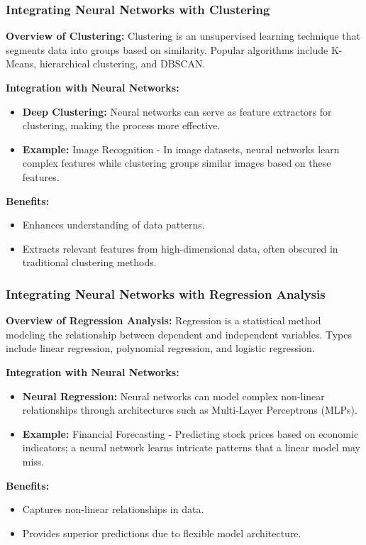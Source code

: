 \documentclass[aspectratio=169]{beamer}
\begin{document}
\begin{frame}[fragile]
    \frametitle{Integrating Neural Networks with Clustering}
    \textbf{Overview of Clustering:} Clustering is an unsupervised learning technique that segments data into groups based on similarity. Popular algorithms include K-Means, hierarchical clustering, and DBSCAN.
    
    \textbf{Integration with Neural Networks:}
    \begin{itemize}
        \item \textbf{Deep Clustering:} Neural networks can serve as feature extractors for clustering, making the process more effective.
        \item \textbf{Example:} Image Recognition - In image datasets, neural networks learn complex features while clustering groups similar images based on these features.
    \end{itemize}
    
    \textbf{Benefits:}
    \begin{itemize}
        \item Enhances understanding of data patterns.
        \item Extracts relevant features from high-dimensional data, often obscured in traditional clustering methods.
    \end{itemize}
\end{frame}

\begin{frame}[fragile]
    \frametitle{Integrating Neural Networks with Regression Analysis}
    \textbf{Overview of Regression Analysis:} Regression is a statistical method modeling the relationship between dependent and independent variables. Types include linear regression, polynomial regression, and logistic regression.
    
    \textbf{Integration with Neural Networks:}
    \begin{itemize}
        \item \textbf{Neural Regression:} Neural networks can model complex non-linear relationships through architectures such as Multi-Layer Perceptrons (MLPs).
        \item \textbf{Example:} Financial Forecasting - Predicting stock prices based on economic indicators; a neural network learns intricate patterns that a linear model may miss.
    \end{itemize}

    \textbf{Benefits:}
    \begin{itemize}
        \item Captures non-linear relationships in data.
        \item Provides superior predictions due to flexible model architecture.
    \end{itemize}
\end{frame}
\end{document}
